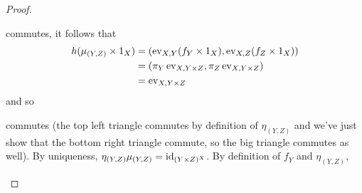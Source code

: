 \begin{solution}
\begin{exercises}
\begin{proof}
\begin{center}
\begin{tikzcd}
                \end{tikzcd}
            \end{center}
            commutes, it follows that
            \begin{align*}
                h (\mu_{(Y,Z)}\times 1_X)&=(\ev{X,Y}(f_Y\times 1_X), \ev{X, Z}(f_Z\times 1_X))\\
                &=(\pi_Y\ev{X,Y\times Z}, \pi_Z\ev{X,Y\times Z})\\
                &=\ev{X,Y\times Z}
            \end{align*}
            and so 
            \begin{center}
            \end{center}
            commutes (the top left triangle commutes by definition of $\eta_{(Y,Z)}$ and we've just show that the bottom right triangle commute, so the big triangle commutes as well). 
            By uniqueness, $\eta_{(Y,Z)}\mu_{(Y,Z)}=\id_{(Y\times Z)^X}$. 
            By definition of $f_Y$ and $\eta_{(Y,Z)}$,
            \begin{center}
\end{center}
\end{proof}
\end{exercises}
\end{solution}
